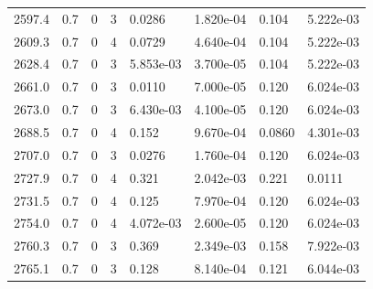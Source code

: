 \documentclass[preview]{standalone}
\begin{document}
{{{{{\begin{tabular}{L{1.2cm}C{1.2cm} C{0.3cm}C{0.5cm} C{1.4cm}C{1.4cm} C{1.4cm}C{1.4cm}}
  2597.4  &   0.7  & 0     &  3 &  0.0286  & 1.820e-04  & 0.104 &  5.222e-03   \\ 
  2609.3  &   0.7  & 0     &  4 &  0.0729  & 4.640e-04  & 0.104 &  5.222e-03   \\ 
  2628.4  &   0.7  & 0     &  3 &  5.853e-03  & 3.700e-05  & 0.104 &  5.222e-03   \\ 
  2661.0  &   0.7  & 0     &  3 &  0.0110  & 7.000e-05  & 0.120 &  6.024e-03   \\ 
  2673.0  &   0.7  & 0     &  3 &  6.430e-03  & 4.100e-05  & 0.120 &  6.024e-03   \\ 
  2688.5  &   0.7  & 0     &  4 &  0.152  & 9.670e-04  & 0.0860 &  4.301e-03   \\ 
  2707.0  &   0.7  & 0     &  3 &  0.0276  & 1.760e-04  & 0.120 &  6.024e-03   \\ 
  2727.9  &   0.7  & 0     &  4 &  0.321  & 2.042e-03  & 0.221 &  0.0111   \\ 
  2731.5  &   0.7  & 0     &  4 &  0.125  & 7.970e-04  & 0.120 &  6.024e-03   \\ 
  2754.0  &   0.7  & 0     &  4 &  4.072e-03  & 2.600e-05  & 0.120 &  6.024e-03   \\ 
  2760.3  &   0.7  & 0     &  3 &  0.369  & 2.349e-03  & 0.158 &  7.922e-03   \\ 
  2765.1  &   0.7  & 0     &  3 &  0.128  & 8.140e-04  & 0.121 &  6.044e-03   \\ 
\hline 
\end{tabular} 

}}}}}
\end{document}
